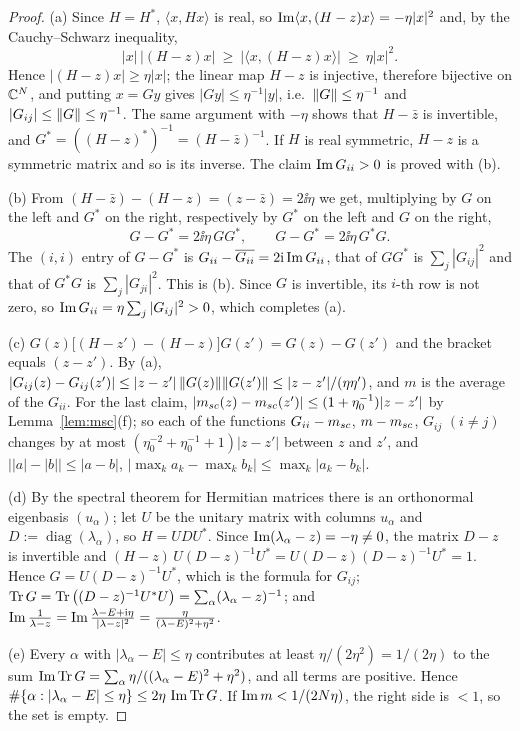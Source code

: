 \begin{proof}
(a) Since $H=H^*$, $\langle x,Hx\rangle$ is real, so $\operatorname{Im}\langle x,(H-z)x\rangle=-\eta|x|^2$ and, by the Cauchy--Schwarz inequality,
\[
 |x|\,|(H-z)x|\ \ge\ |\langle x,(H-z)x\rangle|\ \ge\ \eta|x|^2 .
\]
Hence $|(H-z)x|\ge\eta|x|$; the linear map $H-z$ is injective, therefore bijective on $\mathbb{C}^N$, and putting $x=Gy$ gives $|Gy|\le\eta^{-1}|y|$, i.e.\ $\|G\|\le\eta^{-1}$ and $|G_{ij}|\le\|G\|\le\eta^{-1}$.
The same argument with $-\eta$ shows that $H-\bar z$ is invertible, and $G^*=((H-z)^*)^{-1}=(H-\bar z)^{-1}$. If $H$ is real symmetric, $H-z$ is a symmetric matrix and so is its inverse.
The claim $\operatorname{Im} G_{ii}>0$ is proved with (b).

(b) From $(H-\bar z)-(H-z)=(z-\bar z)=2\ii\eta$ we get, multiplying by $G$ on the left and $G^*$ on the right, respectively by $G^*$ on the left and $G$ on the right,
\[
 G-G^*=2\ii\eta\,GG^*,\qquad G-G^*=2\ii\eta\,G^*G .
\]
The $(i,i)$ entry of $G-G^*$ is $G_{ii}-\overline{G_{ii}}=2\mathrm{i}\operatorname{Im} G_{ii}$, that of $GG^*$ is $\sum_j|G_{ij}|^2$ and that of $G^*G$ is $\sum_j|G_{ji}|^2$. This is (b).
Since $G$ is invertible, its $i$-th row is not zero, so $\operatorname{Im} G_{ii}=\eta\sum_j|G_{ij}|^2>0$, which completes (a).

(c) $G(z)\big[(H-z')-(H-z)\big]G(z')=G(z)-G(z')$ and the bracket equals $(z-z')$. By (a), $|G_{ij}(z)-G_{ij}(z')|\le|z-z'|\,\|G(z)\|\|G(z')\|\le|z-z'|/(\eta\eta')$, and $m$ is the average of the $G_{ii}$.
For the last claim, $|m_{sc}(z)-m_{sc}(z')|\le(1+\eta_0^{-1})|z-z'|$ by Lemma~\ref{lem:msc}(f); so each of the functions $G_{ii}-m_{sc}$, $m-m_{sc}$, $G_{ij}$ $(i\ne j)$ changes by at most
$(\eta_0^{-2}+\eta_0^{-1}+1)|z-z'|$ between $z$ and $z'$, and $\big||a|-|b|\big|\le|a-b|$, $|\max_ka_k-\max_kb_k|\le\max_k|a_k-b_k|$.

(d) By the spectral theorem for Hermitian matrices there is an orthonormal eigenbasis $(u_\alpha)$; let $U$ be the unitary matrix with columns $u_\alpha$ and $D:=\operatorname{diag}(\lambda_\alpha)$, so $H=UDU^*$.
Since $\operatorname{Im}(\lambda_\alpha-z)=-\eta\ne0$, the matrix $D-z$ is invertible and $(H-z)\,U(D-z)^{-1}U^*=U(D-z)(D-z)^{-1}U^*=1$. Hence $G=U(D-z)^{-1}U^*$, which is the formula for $G_{ij}$;
$\operatorname{Tr} G=\operatorname{Tr}\big((D-z)^{-1}U^*U\big)=\sum_\alpha(\lambda_\alpha-z)^{-1}$; and $\operatorname{Im}\frac1{\lambda-z}=\operatorname{Im}\frac{\lambda-E+\mathrm{i}\eta}{|\lambda-z|^2}=\frac{\eta}{(\lambda-E)^2+\eta^2}$.

(e) Every $\alpha$ with $|\lambda_\alpha-E|\le\eta$ contributes at least $\eta/(2\eta^2)=1/(2\eta)$ to the sum $\operatorname{Im}\operatorname{Tr} G=\sum_\alpha\eta/((\lambda_\alpha-E)^2+\eta^2)$, and all terms are positive. Hence
$\#\{\alpha:|\lambda_\alpha-E|\le\eta\}\le2\eta\,\operatorname{Im}\operatorname{Tr} G$. If $\operatorname{Im} m<1/(2N\eta)$, the right side is $<1$, so the set is empty.


\end{proof}

